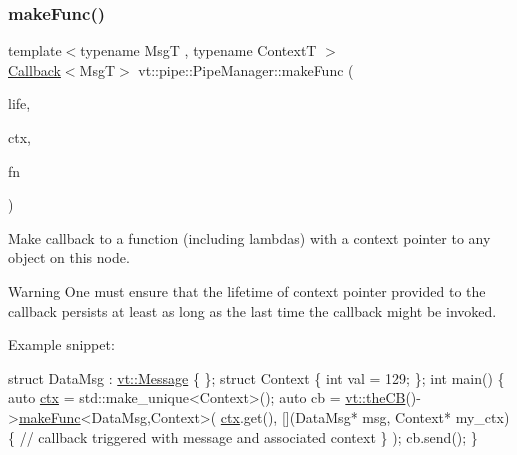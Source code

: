 \subsubsection{\texorpdfstring{make\+Func()}{makeFunc()}\hspace{0.1cm}{\footnotesize\ttfamily [3/6]}}
{\footnotesize\ttfamily template$<$typename MsgT , typename ContextT $>$ \\
\hyperlink{namespacevt_a36db99df4c973d48b1118a293fff533f}{Callback}$<$MsgT$>$ vt\+::pipe\+::\+Pipe\+Manager\+::make\+Func (\begin{DoxyParamCaption}\item[{\hyperlink{namespacevt_1_1pipe_acb42b284378c0fdac1d7c6335dc26f58}{Lifetime\+Enum}}]{life,  }\item[{ContextT $\ast$}]{ctx,  }\item[{\hyperlink{structvt_1_1pipe_1_1_pipe_manager_base_a73fdf82ece0411b3dc644c99b763f7a9}{Func\+Msg\+Ctx\+Type}$<$ MsgT, ContextT $>$}]{fn }\end{DoxyParamCaption})}



Make callback to a function (including lambdas) with a context pointer to any object on this node. 

\begin{DoxyWarning}{Warning}
One must ensure that the lifetime of context pointer provided to the callback persists at least as long as the last time the callback might be invoked.
\end{DoxyWarning}
Example snippet\+:


\begin{DoxyCode}
\textcolor{keyword}{struct }DataMsg : \hyperlink{structvt_1_1messaging_1_1_active_msg}{vt::Message} \{ \};
\textcolor{keyword}{struct }Context \{ \textcolor{keywordtype}{int} val = 129; \};
\textcolor{keywordtype}{int} main() \{
  \textcolor{keyword}{auto} \hyperlink{namespacevt_1_1config_a0551245b6b893932b95aaf8eac94eed1}{ctx} = std::make\_unique<Context>();
  \textcolor{keyword}{auto} cb = \hyperlink{namespacevt_a673b109e94c7bca58313504c83e1da94}{vt::theCB}()->\hyperlink{structvt_1_1pipe_1_1_pipe_manager_a9ceec59c887d0fa1498b931c788962f6}{makeFunc}<DataMsg,Context>(
    \hyperlink{namespacevt_1_1config_a0551245b6b893932b95aaf8eac94eed1}{ctx}.get(), [](DataMsg* msg, Context* my\_ctx)\{
      \textcolor{comment}{// callback triggered with message and associated context}
    \}
  );
  cb.send();
\}
\end{DoxyCode}



